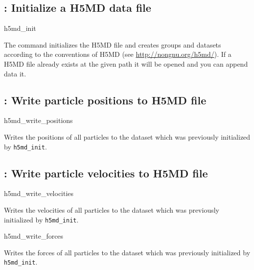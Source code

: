 \subsection{: Initialize a H5MD data file}

\begin{essyntax}
h5md_init
    \begin{features}
    \end{features}
\end{essyntax}
The  command initializes the H5MD file and creates 
groups and datasets according to the conventions of H5MD (see
\url{http://nongnu.org/h5md/}). If a H5MD file already exists at the given
path it will be opened and you can append data it.

\subsection{: Write particle positions to H5MD
file}

\begin{essyntax}
h5md_write_positions
  \begin{features}
  \end{features}
\end{essyntax}
Writes the positions of all particles to the dataset which was previously 
initialized by \texttt{h5md_init}.

\subsection{: Write particle velocities to H5MD
file}

\begin{essyntax}
h5md_write_velocities
  \begin{features}
  \end{features}
\end{essyntax}
Writes the velocities of all particles to the dataset which was previously 
initialized by \texttt{h5md_init}.

\begin{essyntax}
h5md_write_forces
  \begin{features}
  \end{features}
\end{essyntax}
Writes the forces of all particles to the dataset which was previously 
initialized by \texttt{h5md_init}.

